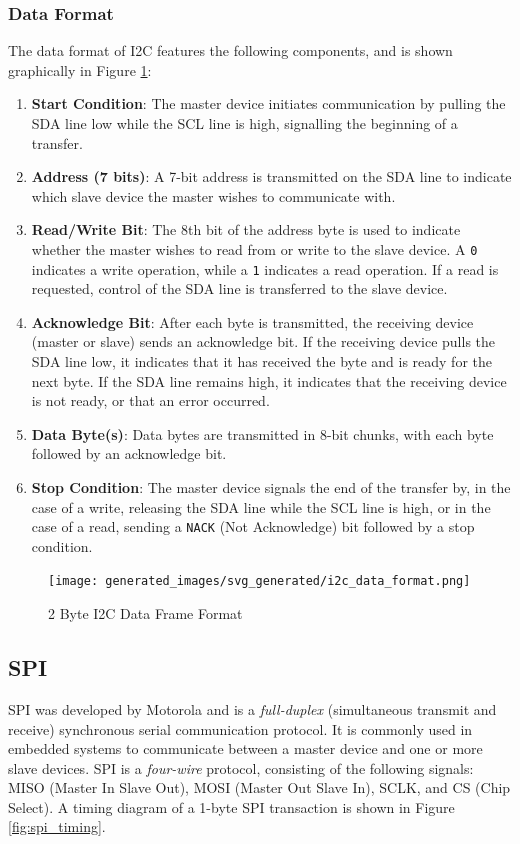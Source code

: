 \documentclass[main.tex]{subfiles}
\begin{document}
\subsubsection{Data Format}
The data format of I2C features the following components, and is shown graphically in Figure \ref{fig:i2c_data_format}:
\begin{enumerate}
    \item \textbf{Start Condition}: The master device initiates communication by pulling the SDA line low while the SCL line is high, signalling the beginning of a transfer.
    \item \textbf{Address (7 bits)}: A 7-bit address is transmitted on the SDA line to indicate which slave device the master wishes to communicate with.
    \item \textbf{Read/Write Bit}: The 8th bit of the address byte is used to indicate whether the master wishes to read from or write to the slave device. A \texttt{0} indicates a write operation, while a \texttt{1} indicates a read operation. If a read is requested, control of the SDA line is transferred to the slave device.
    \item \textbf{Acknowledge Bit}: After each byte is transmitted, the receiving device (master or slave) sends an acknowledge bit. If the receiving device pulls the SDA line low, it indicates that it has received the byte and is ready for the next byte. If the SDA line remains high, it indicates that the receiving device is not ready, or that an error occurred.
    \item \textbf{Data Byte(s)}: Data bytes are transmitted in 8-bit chunks, with each byte followed by an acknowledge bit.
    \item \textbf{Stop Condition}: The master device signals the end of the transfer by, in the case of a write, releasing the SDA line while the SCL line is high, or in the case of a read, sending a \texttt{NACK} (Not Acknowledge) bit followed by a stop condition.
\end{enumerate}

\begin{figure}[H]
    \centering
    \texttt{[image: generated\_images/svg\_generated/i2c\_data\_format.png]}
    \caption{2 Byte I2C Data Frame Format}
    \label{fig:i2c_data_format}
\end{figure}

\subsection{SPI}
SPI was developed by Motorola \cite{SPI_history} and is a \textit{full-duplex} (simultaneous transmit and receive) synchronous serial communication protocol. It is commonly used in embedded systems to communicate between a master device and one or more slave devices. SPI is a \textit{four-wire} protocol, consisting of the following signals: MISO (Master In Slave Out), MOSI (Master Out Slave In), SCLK, and CS (Chip Select). A timing diagram of a 1-byte SPI transaction is shown in Figure \ref{fig:spi_timing}.
\end{document}
